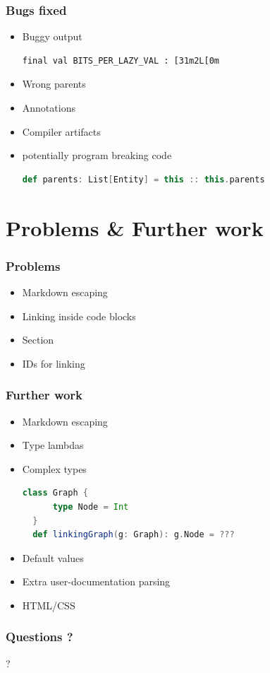 \documentclass{beamer}
\begin{document}
\begin{frame}[fragile]
  \frametitle{Bugs fixed}
  \begin{itemize}
    \item Buggy output
\begin{lstlisting}
final val BITS_PER_LAZY_VAL : [31m2L[0m
\end{lstlisting}\pause
    \item Wrong parents \pause
    \item Annotations \pause
    \item Compiler artifacts \pause
    \item potentially program breaking code
\begin{lstlisting}[language=scala]
def parents: List[Entity] = this :: this.parents
\end{lstlisting}
  \end{itemize}
\end{frame}

\section{Problems \& Further work}

\begin{frame}
  \frametitle{Problems}
  \begin{itemize}
    \item Markdown escaping \pause
    \item Linking inside code blocks \pause
    \item Section \pause
    \item IDs for linking
  \end{itemize}
\end{frame}

\begin{frame}[fragile]
  \frametitle{Further work}
  \begin{itemize}
    \item Markdown escaping \pause
    \item Type lambdas \pause
    \item Complex types
\begin{lstlisting}[language=scala]
  class Graph {
      type Node = Int
  }
  def linkingGraph(g: Graph): g.Node = ???    
\end{lstlisting}\pause
    \item Default values \pause
    \item Extra user-documentation parsing \pause
    \item HTML/CSS
  \end{itemize}
\end{frame}

\begin{frame}
  \frametitle{Questions ?}
  \begin{center}
    \Huge{?}
  \end{center}
\end{frame}
\end{document}
